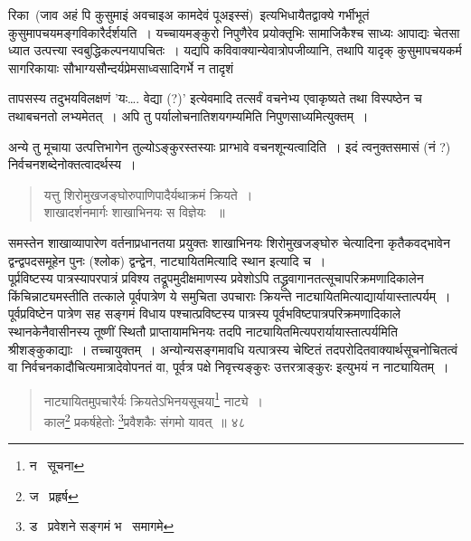 \documentclass[11pt, openany]{book}
\begin{document}
रिका\textendash\ (जाव अहं पि कुसुमाइं अवचाइअ कामदेवं पूअइस्सं)\textendash\ इत्यभिधायैतद्वाक्ये गर्भीभूतं कुसुमापचयमङ्गविकारैर्दर्शयति~। यच्चायमङ्कुरो निपुणैरेव प्रयोक्तृभिः सामाजिकैश्च साध्यः आपाद्यः चेतसा ध्यात उत्पत्त्या स्वबुद्धिकल्पनयापचितः~। यद्यपि कविवाक्यान्येवात्रोपजीव्यानि, तथापि यादृक् कुसुमापचयकर्म सागरिकायाः सौभाग्यसौन्दर्यप्रेमसाध्वसादिगर्भे न तादृशं {तापसस्य तदुभयविलक्षणं 'यः\ldots . वेद्या (?)' इत्येवमादि तत्सर्वं वचनेभ्य एवाकृष्यते तथा विस्पष्ठेन च तथाबचनतो लभ्यमेतत्~। अपि तु पर्यालोचनातिशयगम्यमिति निपुणसाध्यमित्युक्तम्~। 

अन्ये तु मूचाया उत्पत्तिभागेन तुल्योऽङ्कुरस्तस्याः प्राग्भावे वचनशून्यत्वादिति~। इदं त्वनुक्तसमासं (नं ?) निर्वचनशब्देनोक्तत्वादर्थस्य~। \\

\begin{quote}
 {\qt यत्तु शिरोमुखजङ्घोरुपाणिपादैर्यथाक्रमं क्रियते~। \\
शाखादर्शनमार्गः शाखाभिनयः स विज्ञेयः ~॥ }\\
\end{quote}

समस्तेन शाखाव्यापारेण वर्तनाप्रधानतया प्रयुक्तः शाखाभिनयः शिरोमुखजङ्घोरु चेत्यादिना कृतैकवद्भावेन द्वन्द्वपदसमूहेन पुनः (श्लोक) द्वन्द्वेन, नाट्यायितमित्यादि स्थान इत्यादि च~।\\ 

पूर्प्रविष्टस्य पात्रस्यापरपात्रं प्रविश्य तद्रूपमुदीक्षमाणस्य प्रवेशोऽपि तद्ध्रुवागानतत्सूचापरिक्रमणादिकालेन किंचिन्नाट्यमस्तीति तत्काले पूर्वपात्रेण ये समुचिता उपचाराः क्रियन्ते नाट्यायितमित्याद्यार्यायास्तात्पर्यम्~। पूर्वप्रविष्टेन पात्रेण सह सङ्गमं विधाय पश्चात्प्रविष्टस्य पात्रस्य पूर्वभविष्टपात्रपरिक्रमणादिकाले स्थानकेनैवासीनस्य तूष्णीं स्थितौ प्राप्तायामभिनयः तदपि नाट्यायितमित्यपरार्यायास्तात्पर्यमिति श्रीशङ्कुकाद्याः~। तच्चायुक्तम्~। अन्योन्यसङ्गमावधि यत्पात्रस्य चेष्टितं तदपरोदितवाक्यार्थसूचनोचितत्वं वा निर्वचनकादौचित्यमात्रादेवोपनतं वा, पूर्वत्र पक्षे निवृत्त्यङ्कुरः उत्तरत्राङ्कुरः इत्युभयं न नाट्यायितम्~। 

\newpage

\begin{quote}
 {\na नाट्यायितमुपचारैर्यः क्रियतेऽभिनयसूचया\renewcommand{\thefootnote}{1}\footnote{न \textendash\ सूचना} नाट्ये~। \\
काल\renewcommand{\thefootnote}{2}\footnote{ज \textendash\ प्रहृर्ष} प्रकर्षहेतोः \renewcommand{\thefootnote}{3}\footnote{ड \textendash\ प्रवेशने सङ्गमं भ \textendash\ समागमे}प्रवैशकैः संगमो यावत्~॥ ४८ }
\end{quote}

}
\end{document}
